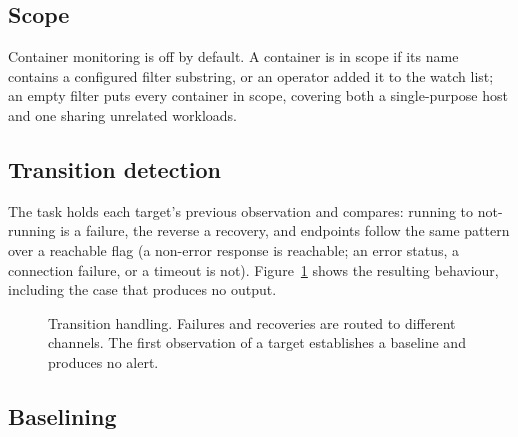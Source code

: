 \documentclass[11pt,a4paper]{article}
\begin{document}
\subsection{Scope}

Container monitoring is off by default. A container is in scope if its name contains
a configured filter substring, or an operator added it to the watch list; an empty
filter puts every container in scope, covering both a single-purpose host and one
sharing unrelated workloads.

\subsection{Transition detection}

The task holds each target's previous observation and compares: running to
not-running is a failure, the reverse a recovery, and endpoints follow the same
pattern over a reachable flag (a non-error response is reachable; an error status, a
connection failure, or a timeout is not). Figure~\ref{fig:transitions} shows the
resulting behaviour, including the case that produces no output.

\begin{figure}[H]
\centering
{}
\caption{Transition handling. Failures and recoveries are routed to different channels.
The first observation of a target establishes a baseline and produces no alert.}
\label{fig:transitions}
\end{figure}

\subsection{Baselining}
\end{document}
